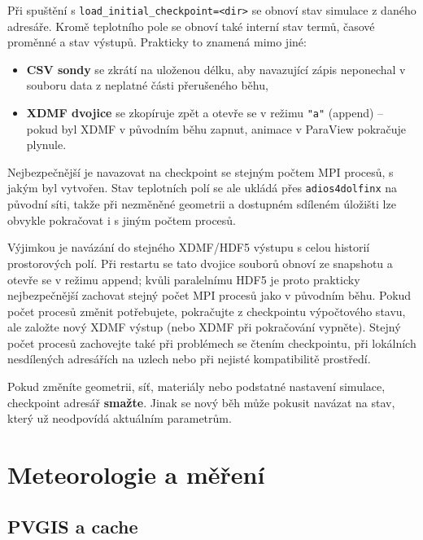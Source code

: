 \documentclass[a4paper,11pt]{article}
\begin{document}
Při spuštění s \texttt{load\_initial\_checkpoint=<dir>} se obnoví stav simulace
z daného adresáře. Kromě teplotního pole se obnoví také interní stav termů,
časové proměnné a stav výstupů. Prakticky to znamená mimo jiné:

\begin{itemize}
  \item \textbf{CSV sondy} se zkrátí na uloženou délku, aby navazující zápis
        neponechal v souboru data z neplatné části přerušeného běhu,
  \item \textbf{XDMF dvojice} se zkopíruje zpět a otevře se v režimu
        \texttt{"a"} (append) -- pokud byl XDMF v původním běhu zapnut,
        animace v ParaView pokračuje plynule.
\end{itemize}

\begin{noteblock}
Nejbezpečnější je navazovat na checkpoint se stejným počtem MPI procesů, s jakým
byl vytvořen. Stav teplotních polí se ale ukládá přes \texttt{adios4dolfinx} na
původní síti, takže při nezměněné geometrii a dostupném sdíleném úložišti lze
obvykle pokračovat i s jiným počtem procesů.

Výjimkou je navázání do stejného XDMF/HDF5 výstupu s celou historií prostorových
polí. Při restartu se tato dvojice souborů obnoví ze snapshotu a otevře se v
režimu append; kvůli paralelnímu HDF5 je proto prakticky nejbezpečnější zachovat
stejný počet MPI procesů jako v původním běhu. Pokud počet procesů změnit
potřebujete, pokračujte z checkpointu výpočtového stavu, ale založte nový XDMF
výstup (nebo XDMF při pokračování vypněte). Stejný počet procesů zachovejte také
při problémech se čtením checkpointu, při lokálních nesdílených adresářích na
uzlech nebo při nejisté kompatibilitě prostředí.

Pokud změníte geometrii, síť, materiály nebo podstatné nastavení simulace,
checkpoint adresář \textbf{smažte}. Jinak se nový běh může pokusit navázat na
stav, který už neodpovídá aktuálním parametrům.
\end{noteblock}

\section{Meteorologie a měření}\label{sec:meteo}

\subsection*{PVGIS a cache}
\end{document}
